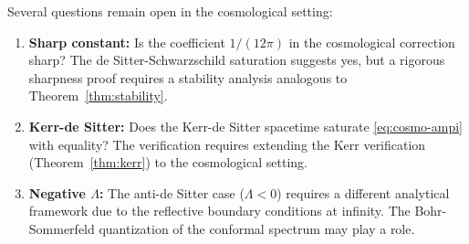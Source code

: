 \begin{remark}
Several questions remain open in the cosmological setting:
\begin{enumerate}
    \item \textbf{Sharp constant:} Is the coefficient $1/(12\pi)$ in the cosmological correction sharp? The de Sitter-Schwarzschild saturation suggests yes, but a rigorous sharpness proof requires a stability analysis analogous to Theorem~\ref{thm:stability}.
    \item \textbf{Kerr-de Sitter:} Does the Kerr-de Sitter spacetime saturate \eqref{eq:cosmo-ampi} with equality? The verification requires extending the Kerr verification (Theorem~\ref{thm:kerr}) to the cosmological setting.
    \item \textbf{Negative $\Lambda$:} The anti-de Sitter case ($\Lambda < 0$) requires a different analytical framework due to the reflective boundary conditions at infinity. The Bohr-Sommerfeld quantization of the conformal spectrum may play a role.
\end{enumerate}
\end{remark}

